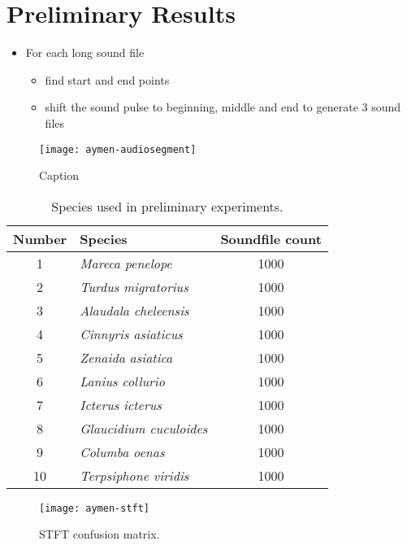 \FloatBarrier

\section{Preliminary Results}

	\begin{itemize}
		\item For each long sound file
		\begin{itemize}
			\item find start and end points
			\item shift the sound pulse to beginning, middle and end
				to generate 3 sound files
		\end{itemize}
	\end{itemize}


\begin{figure}%
    \centering
    \texttt{[image: aymen-audiosegment]}
    \caption{Caption}
    \label{aymen-audiosegment}
\end{figure}

\begin{table}%
	\caption{Species used in preliminary experiments.}
    \label{tab:my_label}
    \centering
	\begin{tabular}{clc}
    \toprule
	\textbf{Number} & 
	\textbf{Species} &
	\textbf{Soundfile count} \\
	\midrule
	1 & \textit{Mareca penelope} & 1000 \\
	2 & \textit{Turdus migratorius} & 1000 \\
	3 & \textit{Alaudala cheleensis} & 1000 \\
	4 & \textit{Cinnyris asiaticus} &  1000 \\
	5 & \textit{Zenaida asiatica} & 1000 \\
	6 & \textit{Lanius collurio} & 1000 \\
	7 & \textit{Icterus icterus} & 1000 \\
	8 & \textit{Glaucidium cuculoides} & 1000 \\
	9 & \textit{Columba oenas} & 1000 \\
	10 & \textit{Terpsiphone viridis} & 1000 \\	
	\bottomrule
	\end{tabular}
\end{table}

\begin{figure}%
    \centering
    \texttt{[image: aymen-stft]}
    \caption{STFT confusion matrix.}
    \label{aymen-stft}
\end{figure}

